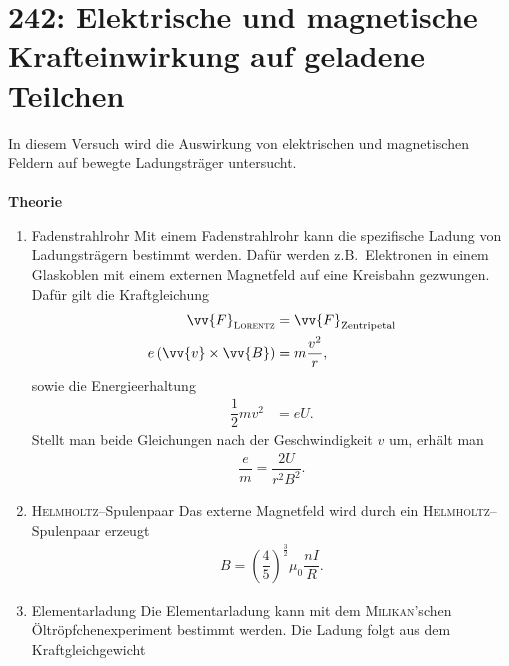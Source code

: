 \newpage
\section{242: Elektrische und magnetische Krafteinwirkung auf geladene Teilchen}
In diesem Versuch wird die Auswirkung von elektrischen und magnetischen Feldern auf bewegte Ladungsträger untersucht.\\\\
\textbf{Theorie} 
\begin{enumerate}[label=--]
        \item Fadenstrahlrohr \hspace{25pt}
                Mit einem Fadenstrahlrohr kann die spezifische Ladung von Ladungsträgern bestimmt werden.
                Dafür werden z.B.\ Elektronen in einem Glaskoblen mit einem externen Magnetfeld auf eine Kreisbahn gezwungen.
                Dafür gilt die Kraftgleichung
                \begin{align} 
                        \vv{F}_\text{\textsc{Lorentz}}&=\vv{F}_\text{Zentripetal}\\
                        e\left(\vv{v}\times \vv{B}\right)&=m\dfrac{v^2}{r}
                ,\end{align} 
                sowie die Energieerhaltung
                \begin{align} 
                        \dfrac{1}{2}mv^2&=eU
                .\end{align} 
                Stellt man beide Gleichungen nach der Geschwindigkeit $v$ um, erhält man
                \begin{align} 
                        \dfrac{e}{m}=\dfrac{2U}{r^2B^2}
                .\end{align} 
        \item \textsc{Helmholtz}--Spulenpaar \hspace{25pt}
                Das externe Magnetfeld wird durch ein \textsc{Helmholtz}--Spulenpaar erzeugt
                \begin{align} 
                        B=\left(\dfrac{4}{5}\right)^{\tfrac{3}{2}}\mu _0\dfrac{nI}{R}
                .\end{align} 
        \item Elementarladung \hspace{25pt}
                Die Elementarladung kann mit dem \textsc{Milikan}'schen Öltröpfchenexperiment bestimmt werden.
                Die Ladung folgt aus dem Kraftgleichgewicht
                \begin{align} 

\end{align}
\end{enumerate}
